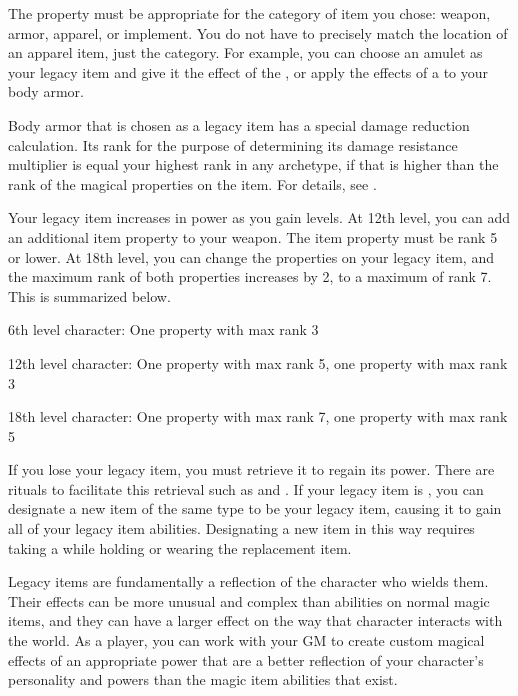     The property must be appropriate for the category of item you chose: weapon, armor, apparel, or implement.
    You do not have to precisely match the location of an apparel item, just the category.
    For example, you can choose an amulet as your legacy item and give it the effect of the , or apply the effects of a  to your body armor.

     Body armor that is chosen as a legacy item has a special damage reduction calculation.
    Its rank for the purpose of determining its damage resistance multiplier is equal your highest rank in any archetype, if that is higher than the rank of the magical properties on the item.
    For details, see .

    Your legacy item increases in power as you gain levels.
    At 12th level, you can add an additional item property to your weapon.
    The item property must be rank 5 or lower.
    At 18th level, you can change the properties on your legacy item, and the maximum rank of both properties increases by 2, to a maximum of rank 7.
    This is summarized below.
    \begin{raggeditemize}
      \item 6th level character: One property with max rank 3
      \item 12th level character: One property with max rank 5, one property with max rank 3
      \item 18th level character: One property with max rank 7, one property with max rank 5
    \end{raggeditemize}

    If you lose your legacy item, you must retrieve it to regain its power.
    There are rituals to facilitate this retrieval such as  and .
    If your legacy item is , you can designate a new item of the same type to be your legacy item, causing it to gain all of your legacy item abilities.
    Designating a new item in this way requires taking a  while holding or wearing the replacement item.

    Legacy items are fundamentally a reflection of the character who wields them.
    Their effects can be more unusual and complex than abilities on normal magic items, and they can have a larger effect on the way that character interacts with the world.
    As a player, you can work with your GM to create custom magical effects of an appropriate power that are a better reflection of your character's personality and powers than the magic item abilities that exist.
